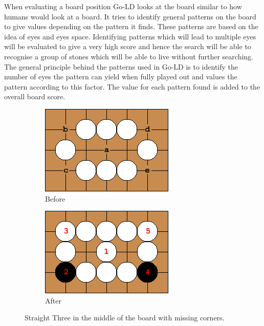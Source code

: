 \documentclass{l4proj}
\begin{document}
When evaluating a board position Go-LD looks at the board similar to how humans would look at a board. It tries to identify general patterns on the board to give values depending on the pattern it finds. These patterns are based on the idea of eyes and eyes space. Identifying patterns which will lead to multiple eyes will be evaluated to give a very high score and hence the search will be able to recognise a group of stones which will be able to live without further searching. The general principle behind the patterns used in Go-LD is to identify the number of eyes the pattern can yield when fully played out and values the pattern according to this factor. The value for each pattern found is added to the overall board score.

\begin{figure}[!ht]
\centering
\begin{subfigure}[b]{0.35\textwidth}
\centering
\includegraphics[width=\textwidth]{heur/1a.png}
\caption{Before}
\label{fig:heur-1a}
\end{subfigure}\qquad
\begin{subfigure}[b]{0.35\textwidth}
\centering
\includegraphics[width=\textwidth]{heur/1b.png}
\caption{After}
\label{fig:heur-1b}
\end{subfigure}
\caption{Straight Three in the middle of the board with missing corners.}
\label{fig:heur-1}
\end{figure}
\end{document}
